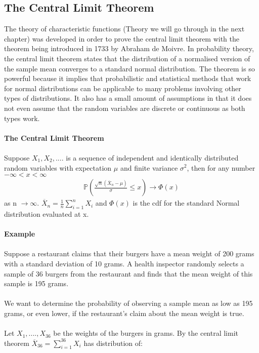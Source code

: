 \documentclass[,oneside]{article}
\begin{document}
\begin{enumerate}
\subsection{The Central Limit Theorem}
The theory of characteristic functions (Theory we will go through in the next chapter) was developed in order to prove the central limit theorem with the theorem being introduced in 1733 by Abraham de Moivre. In probability theory, the central limit theorem states that the distribution of a normalised version of the sample mean converges to a standard normal distribution. The theorem is so powerful because it implies that probabilistic and statistical methods that work for normal distributions can be applicable to many problems involving other types of distributions. It also has a small amount of assumptions in that it does not even assume that the random variables are discrete or continuous as both types work.\\ \\
\textbf{The Central Limit Theorem}\\ \\
Suppose $X_1, X_2,....$ is a sequence of independent and identically distributed random variables with expectation $\mu$ and finite variance $\sigma^2$, then for any number $-\infty < x < \infty$
\begin{align*}
\mathbb{P} \left ( \frac{\sqrt{n}(\overline{X}_n-\mu)}{\sigma} \leq x \right ) \to \Phi (x)
\end{align*}
as n $\to \infty$. $\overline{X}_n = \frac{1}{n}\sum_{i=1}^{n}X_i$ and $\Phi (x)$ is the cdf for the standard Normal distribution evaluated at x.\\ \\
\textbf{Example}\\ \\
Suppose a restaurant claims that their burgers have a mean weight of 200 grams with a standard deviation of 10 grams. A health inspector randomly selects a sample of 36 burgers from the restaurant and finds that the mean weight of this sample is 195 grams.\\ \\
We want to determine the probability of observing a sample mean as low as 195 grams, or even lower, if the restaurant's claim about the mean weight is true.\\ \\
Let $X_1,....,X_{36}$ be the weights of the burgers in grams. By the central limit theorem $\overline{X}_{36}=\sum_{i=1}^{36} X_i$ has distribution of:
\begin{align*}

\end{align*}
\end{enumerate}
\end{document}
